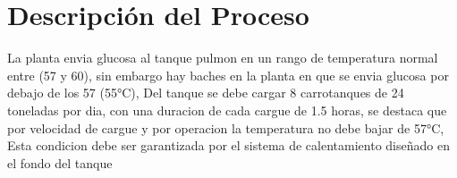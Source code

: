 \documentclass[11pt,a4paper]{article}
\begin{document}
\section{Descripción del Proceso}

La planta envia glucosa al tanque pulmon en un rango de temperatura normal entre (57 y 60), sin embargo hay baches en la planta en que se envia glucosa por debajo de los 57 (55°C), Del tanque se debe cargar 8 carrotanques de 24 toneladas por dia, con una duracion de cada cargue de 1.5 horas, se destaca que por velocidad de cargue y por operacion la temperatura no debe bajar de 57°C, Esta condicion debe ser garantizada por el sistema de calentamiento diseñado en el fondo del tanque
\end{document}
